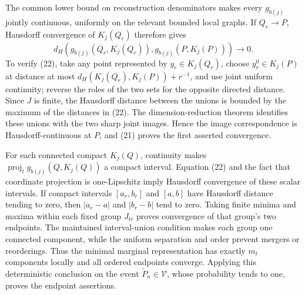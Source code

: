 The common lower bound on reconstruction denominators makes every \(g_{b(j)}\) jointly continuous, uniformly on the relevant bounded local graphs.  If \(Q_r\to P\), Hausdorff convergence of \(K_j(Q_r)\) therefore gives
\[
 d_H\!\left(g_{b(j)}(Q_r,K_j(Q_r)),g_{b(j)}(P,K_j(P))\right)\longrightarrow0.
 \tag{22}
\]
To verify (22), take any point represented by \(y_r\in K_j(Q_r)\), choose \(y_r^0\in K_j(P)\) at distance at most \(d_H(K_j(Q_r),K_j(P))+r^{-1}\), and use joint uniform continuity; reverse the roles of the two sets for the opposite directed distance.  Since \(J\) is finite, the Hausdorff distance between the unions is bounded by the maximum of the distances in (22).  The dimension-reduction theorem identifies these unions with the two sharp joint images.  Hence the image correspondence is Hausdorff-continuous at \(P\), and (21) proves the first asserted convergence.

For each connected compact \(K_j(Q)\), continuity makes \(\operatorname{proj}_t g_{b(j)}(Q,K_j(Q))\) a compact interval.  Equation (22) and the fact that coordinate projection is one-Lipschitz imply Hausdorff convergence of these scalar intervals.  If compact intervals \([a_r,b_r]\) and \([a,b]\) have Hausdorff distance tending to zero, then \(|a_r-a|\) and \(|b_r-b|\) tend to zero.  Taking finite minima and maxima within each fixed group \(J_{tr}\) proves convergence of that group's two endpoints.  The maintained interval-union condition makes each group one connected component, while the uniform separation and order prevent mergers or reorderings.  Thus the minimal marginal representation has exactly \(m_t\) components locally and all ordered endpoints converge.  Applying this deterministic conclusion on the event \(\widetilde P_n\in\mathcal V\), whose probability tends to one, proves the endpoint assertions.
